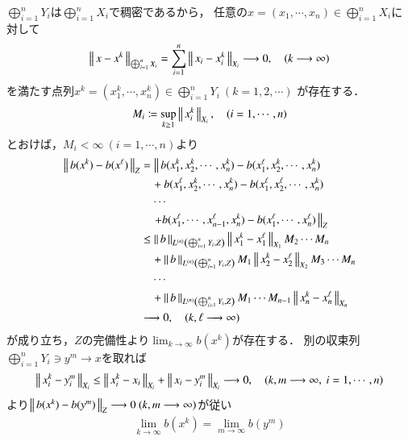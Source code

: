 	\begin{prf}
		$\bigoplus_{i=1}^n Y_i$は$\bigoplus_{i=1}^n X_i$で稠密であるから，
		任意の$x = (x_1,\cdots,x_n) \in \bigoplus_{i=1}^n X_i$に対して
		\begin{align}
			\Norm{x - x^k}{\bigoplus_{i=1}^n X_i}
			= \sum_{i=1}^n \Norm{x_i - x^k_i}{X_i} \longrightarrow 0,
			\quad (k \longrightarrow \infty)
		\end{align}
		を満たす点列$x^k = (x^k_1,\cdots,x^k_n) \in \bigoplus_{i=1}^n Y_i\ (k=1,2,\cdots)$
		が存在する．
		\begin{align}
			M_i \coloneqq \sup{k \geq 1}{\Norm{x^k_i}{X_i}},
			\quad (i=1,\cdots,n)
		\end{align}
		とおけば，$M_i < \infty\ (i=1,\cdots,n)$より
		\begin{align}
			\Norm{b(x^k) - b(x^\ell)}{Z}
			&= \left\|\, b(x^k_1,x^k_2,\cdots,x^k_n) - b(x^\ell_1,x^k_2,\cdots,x^k_n) \right. \\
				&\quad + b(x^\ell_1,x^k_2,\cdots,x^k_n) - b(x^\ell_1,x^\ell_2,\cdots,x^k_n) \\
				&\quad \cdots \\
				&\quad \left. + b(x^\ell_1,\cdots,x^\ell_{n-1},x^k_n) - b(x^\ell_1,\cdots,x^\ell_n)\,  \right\|_Z \\
			&\leq \Norm{b}{\ContLn{\bigoplus_{i=1}^n Y_i}{Z}{n}} \Norm{x^k_1 - x^\ell_1}{X_1} M_2 \cdots M_n \\
			&\quad + \Norm{b}{\ContLn{\bigoplus_{i=1}^n Y_i}{Z}{n}} M_1 \Norm{x^k_2 - x^\ell_2}{X_2} M_3 \cdots M_n \\
			&\quad \cdots \\
			&\quad + \Norm{b}{\ContLn{\bigoplus_{i=1}^n Y_i}{Z}{n}} M_1 \cdots M_{n-1} \Norm{x^k_n - x^\ell_n}{X_n} \\
			&\longrightarrow 0,
			\quad (k,\ell \longrightarrow \infty)
		\end{align}
		が成り立ち，$Z$の完備性より$\lim_{k \to \infty}b(x^k)$が存在する．
		別の収束列
		$\bigoplus_{i=1}^n Y_i \ni y^m \longrightarrow x$を取れば
		\begin{align}
			\Norm{x^k_i - y^m_i}{X_i} \leq \Norm{x^k_i - x_i}{X_i} + \Norm{x_i - y^m_i}{X_i}
			\longrightarrow 0,
			\quad (k,m \longrightarrow \infty,\ i=1,\cdots,n)
		\end{align}
		より$\Norm{b(x^k) - b(y^m)}{Z} \longrightarrow 0\ (k,m \longrightarrow \infty)$が従い
		\begin{align}
			\lim_{k \to \infty} b(x^k) = \lim_{m \to \infty} b(y^m)
		\end{align}

\end{prf}
